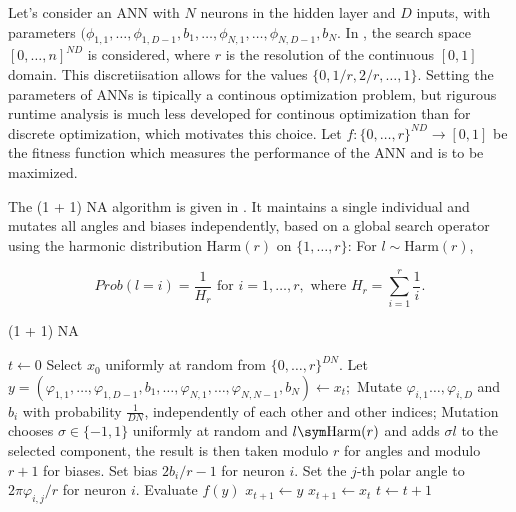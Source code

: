 Let's consider an ANN with $N$ neurons in the hidden layer and $D$ inputs, with parameters
$(\phi_{1,1}, \dots, \phi_{1,D-1}, b_1, \dots, \phi_{N,1}, \dots, \phi_{N,D-1}, b_N$.
In \cite{na}, the search space $[0 , \dots, n]^{N D}$ is considered, where $r$ is the resolution of the continuous $[0, 1]$ domain.
This discretiisation allows for the values $\{0, 1/r, 2/r, \dots, 1\}$. Setting the parameters of ANNs is tipically a continous optimization problem,
but rigurous runtime analysis is much less developed for continous optimization than for discrete optimization, which motivates this choice.
Let $f : \{0 , \dots, r\}^{N D} \to [0, 1]$ be the fitness function which measures the performance of the ANN and is to be maximized.

The (1 + 1) NA algorithm is given in .
It maintains a single individual and mutates all angles and biases independently, based on a global search operator using the harmonic distribution
$\text{Harm}(r)$ on $\{1, \dots, r\}$: For $l \sim \text{Harm}(r)$,

\[
    Prob(l = i) = \frac{1}{H_r} \text{ for } i = 1, \dots, r, \text{ where } H_r = \sum_{i=1}^r \frac{1}{i}.
\]

\begin{algorithm}
\caption{(1 + 1) NA}
\label{alg:na}
\begin{algorithmic}
    \State $t \gets 0$
    \State Select $x_0$ uniformly at random from $\{0, \ldots, r\}^{DN}$.
        \State Let $y = (\varphi_{1,1}, \ldots, \varphi_{1,D-1}, b_1, \ldots, \varphi_{N,1}, \ldots, \varphi_{N,N-1}, b_N) \gets x_t;$
            \State Mutate $\varphi_{i,1} \dots, \varphi_{i,D}$ and $b_i$ with probability $\frac{1}{DN}$, independently of each other and other indices;
            \State Mutation chooses $\sigma \in \{-1, 1\}$ uniformly at random and $l \sym \text{Harm}(r)$ and adds $\sigma l$ to the selected component, the
            result is then taken modulo $r$ for angles and modulo $r + 1$ for biases.
                \State Set bias $2b_i / r - 1$ for neuron $i$.
                    \State Set the $j$-th polar angle to $2\pi \varphi_{i,j} / r$ for neuron $i$.
                \EndFor
            \EndFor
            \State Evaluate $f(y)$
                \State $x_{t+1} \gets y$
            \Else
                \State $x_{t+1} \gets x_t$
            \EndIf
        \EndFor
        \State $t \gets t + 1$
    \EndWhile
\end{algorithmic}
\end{algorithm}

